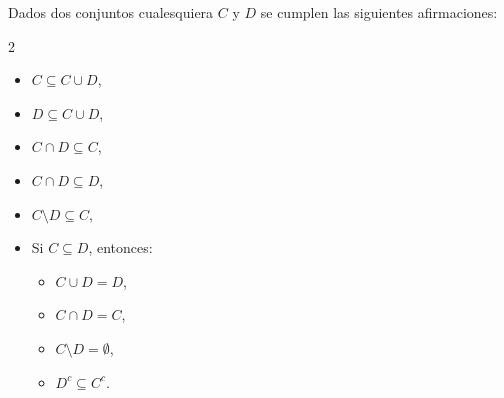 \begin{prop}
	Dados dos conjuntos cualesquiera $C$ y $D$
	se cumplen las siguientes afirmaciones:
	\begin{multicols}{2}
		\begin{itemize}
			\item $C\subseteq C\cup D$, 
			\item $D\subseteq C\cup D$,
			\item $C\cap D\subseteq C$,
			\item $C\cap D\subseteq D$,
			\item $C\setminus D\subseteq C$,
			\item Si $C\subseteq D$, entonces:
			\begin{itemize}
				\item $C\cup D=D$,
				\item $C\cap D=C$,
				\item $C\setminus D=\emptyset$,
				\item $D^c\subseteq C^c$.
			\end{itemize}
		\end{itemize}
	\end{multicols}
\end{prop}
